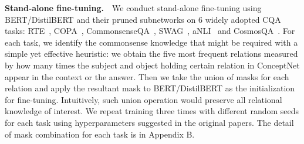 \textbf{Stand-alone fine-tuning.}~~We conduct stand-alone fine-tuning using 
BERT/DistilBERT and their pruned subnetworks on 6 widely adopted CQA tasks: 
RTE~\citep{CambridgeJournals:6906264}, COPA~\citep{roemmele_choice_2011}, 
CommonsenseQA~\citep{talmor-etal-2019-commonsenseqa}, SWAG~\citep{zellers-etal-2018-swag},   
aNLI~\citep{DBLP:journals/corr/abs-1908-05739} and CosmosQA~\citep{huang-etal-2019-cosmos}. 
For each task, we identify the commonsense knowledge that might be required with a simple yet 
effective heuristic: we obtain the five most frequent relations measured by how many times 
the subject and object holding certain relation in ConceptNet appear in the context or the answer. 
Then we take the union of masks for each relation and apply the resultant mask to 
BERT/DistilBERT as the initialization for fine-tuning. 
Intuitively, such union operation would preserve all relational knowledge of interest.
We repeat training three times with different random seeds for each task using 
hyperparameters suggested in the original papers.
The detail of mask combination for each task is in Appendix B.

